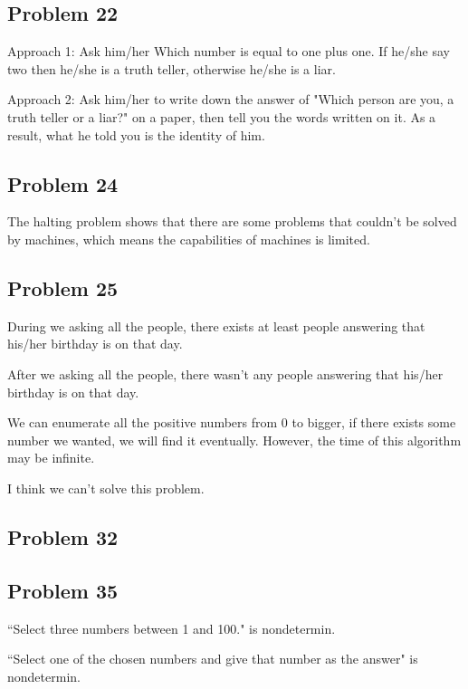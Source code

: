 \documentclass[11pt]{article}
\begin{document}
\subsection{Problem 22}

Approach 1: Ask him/her Which number is equal to one plus one. If he/she say two then he/she is a truth teller, otherwise he/she is a liar.

Approach 2: Ask him/her to write down the answer of "Which person are you, a truth teller or a liar?" on a paper, then tell you the words written on it. As a result, what he told you is the identity of him.

\subsection{Problem 24}

The halting problem shows that there are some problems that couldn't be solved by machines, which means the capabilities of machines is limited.

\subsection{Problem 25}

During we asking all the people, there exists at least people answering that his/her birthday is on that day.

After we asking all the people, there wasn't any people answering that his/her birthday is on that day.

We can enumerate all the positive numbers from 0 to bigger, if there exists some number we wanted, we will find it eventually. However, the time of this algorithm may be infinite.

I think we can't solve this problem.

\subsection{Problem 32}



\subsection{Problem 35}

``Select three numbers between 1 and 100." is nondetermin.

``Select one of the chosen numbers and give that number as the answer" is nondetermin.
\end{document}
